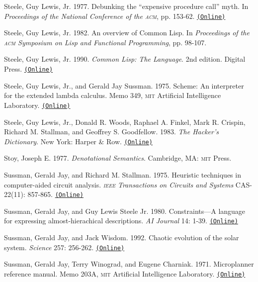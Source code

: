 \documentclass[8pt,oneside]{book}
\newcommand{\acronym}[1]{\textsc{\MakeLowercase{#1}}}
\newcommand{\code}[1]{\texttt{#1}}
\begin{document}
 \label{Steele 1977}
Steele, Guy Lewis, Jr.  1977.  Debunking the ``expensive procedure call'' myth.
In \textit{Proceedings of the National Conference of the \acronym{ACM}},
pp. 153-62.
\href{http://dspace.mit.edu/handle/1721.1/5753}{\code{(Online)}}

 \label{Steele 1982}
Steele, Guy Lewis, Jr.  1982.  An overview of Common Lisp.  In
\textit{Proceedings of the \acronym{ACM} Symposium on Lisp and Functional
Programming}, pp. 98-107.

 \label{Steele 1990}
Steele, Guy Lewis, Jr.  1990.  \textit{Common Lisp: The Language}. 2nd edition.
Digital Press.
\href{http://www.cs.cmu.edu/Groups/AI/html/cltl/cltl2.html}{\code{(Online)}}

 \label{Steele and Sussman 1975}
Steele, Guy Lewis, Jr., and Gerald Jay Sussman.  1975.  Scheme: An interpreter
for the extended lambda calculus.  Memo 349, \acronym{MIT} Artificial
Intelligence Laboratory.
\href{http://dspace.mit.edu/handle/1721.1/5794}{\code{(Online)}}

 \label{Steele et al. 1983}
Steele, Guy Lewis, Jr., Donald R. Woods, Raphael A. Finkel, Mark R.  Crispin,
Richard M. Stallman, and Geoffrey S. Goodfellow.  1983.  \textit{The Hacker's
Dictionary}. New York: Harper \& Row.
\href{http://www.dourish.com/goodies/jargon.html}{\code{(Online)}}

 \label{Stoy 1977}
Stoy, Joseph E.  1977.  \textit{Denotational Semantics}. Cambridge, MA:
\acronym{MIT} Press.

 \label{Sussman and Stallman 1975}
Sussman, Gerald Jay, and Richard M. Stallman.  1975.  Heuristic techniques in
computer-aided circuit analysis.  \textit{\acronym{IEEE} Transactions on Circuits
and Systems} CAS-22(11): 857-865.
\href{http://dspace.mit.edu/handle/1721.1/5803}{\code{(Online)}}

 \label{Sussman and Steele 1980}
Sussman, Gerald Jay, and Guy Lewis Steele Jr.  1980.  Constraints---A language
for expressing almost-hierachical descriptions.  \textit{AI Journal} 14: 1-39.
\href{http://dspace.mit.edu/handle/1721.1/6312}{\code{(Online)}}

 \label{Sussman and Wisdom 1992}
Sussman, Gerald Jay, and Jack Wisdom.  1992. Chaotic evolution of the solar
system.  \textit{Science} 257: 256-262.
\href{http://groups.csail.mit.edu/mac/users/wisdom/ss-chaos.pdf}{\code{(Online)}}

 \label{Sussman et al. (1971)}
Sussman, Gerald Jay, Terry Winograd, and Eugene Charniak.  1971.  Microplanner
reference manual.  Memo 203A, \acronym{MIT} Artificial Intelligence Laboratory.
\href{http://dspace.mit.edu/handle/1721.1/6184}{\code{(Online)}}
\end{document}
